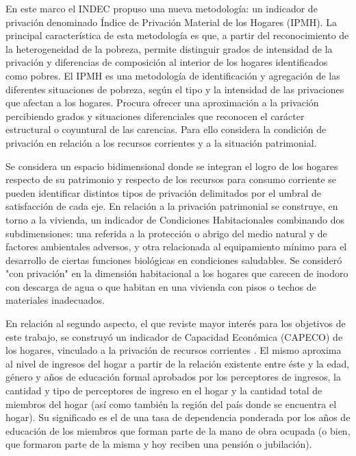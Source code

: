 En este marco el INDEC \citeyear{indec2000a,indec2000b,indec2003a,indec2003b,indec2003c,indec2003d} propuso una nueva metodología: un indicador de privación denominado Índice de Privación Material de los Hogares (IPMH). La principal característica de esta metodología es que, a partir del reconocimiento de la heterogeneidad de la pobreza, permite distinguir grados de intensidad de la privación y diferencias de composición al interior de los hogares identificados como pobres. El IPMH es una metodología de identificación y agregación de las diferentes situaciones de pobreza, según el tipo y la intensidad de las privaciones que afectan a los hogares. Procura ofrecer una aproximación a la privación percibiendo grados y situaciones diferenciales que reconocen el carácter estructural o coyuntural de las carencias. Para ello considera la condición de privación en relación a los recursos corrientes y a la situación patrimonial.

Se considera un espacio bidimensional donde se integran el logro de los hogares respecto de su patrimonio y respecto de los recursos para consumo corriente se pueden identificar distintos tipos de privación delimitados por el umbral de satisfacción de cada eje. En relación a la privación patrimonial se construye, en torno a la vivienda, un indicador de Condiciones Habitacionales combinando dos subdimensiones: una referida a la protección o abrigo del medio natural y de factores ambientales adversos, y otra relacionada al equipamiento mínimo para el desarrollo de ciertas funciones biológicas en condiciones saludables. Se consideró "con privación" en la dimensión habitacional a los hogares que carecen de inodoro con descarga de agua o que habitan en una vivienda con pisos o techos de materiales inadecuados.

En relación al segundo aspecto, el que reviste mayor interés para los objetivos de este trabajo, se construyó un indicador de Capacidad Económica (CAPECO) de los hogares, vinculado a la privación de recursos corrientes \cite{alvarez2002}. El mismo aproxima al nivel de ingresos del hogar a partir de la relación existente entre éste y la edad, género y años de educación formal aprobados por los perceptores de ingresos, la cantidad y tipo de perceptores de ingreso en el hogar y la cantidad total de miembros del hogar (así como también la región del país donde se encuentra el hogar). Su significado es el de una tasa de dependencia ponderada por los años de educación de los miembros que forman parte de la mano de obra ocupada (o bien, que formaron parte de la misma y hoy reciben una pensión o jubilación). 

